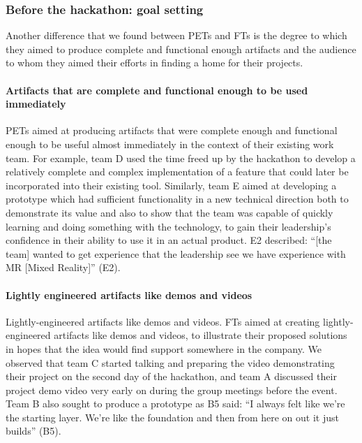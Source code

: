 \documentclass{hcij}
\begin{document}
\subsubsection{Before the hackathon: goal setting}
Another difference that we found between PETs and FTs is the degree to which they aimed to produce complete and functional enough artifacts and the audience to whom they aimed their efforts in finding a home for their projects.

\paragraph{Artifacts that are complete and functional enough to be used immediately}
PETs aimed at producing artifacts that were complete enough and functional enough to be useful almost immediately in the context of their existing work team. For example, team D used the time freed up by the hackathon to develop a relatively complete and complex implementation of a feature that could later be incorporated into their existing tool. Similarly, team E aimed at developing a prototype which had sufficient functionality in a new technical direction both to demonstrate its value and also to show that the team was capable of quickly learning and doing something with the technology, to gain their leadership’s confidence in their ability to use it in an actual product. E2 described: “[the team] wanted to get experience that the leadership see we have experience with MR [Mixed Reality]” (E2).

\paragraph{Lightly engineered artifacts like demos and videos}
Lightly-engineered artifacts like demos and videos. FTs aimed at creating lightly-engineered artifacts like demos and videos, to illustrate their proposed solutions in hopes that the idea would find support somewhere in the company. We observed that team C started talking and preparing the video demonstrating their project on the second day of the hackathon, and team A discussed their project demo video very early on during the group meetings before the event. Team B also sought to produce a prototype as B5 said: “I always felt like we're the starting layer. We're like the foundation and then from here on out it just builds” (B5).
\end{document}
